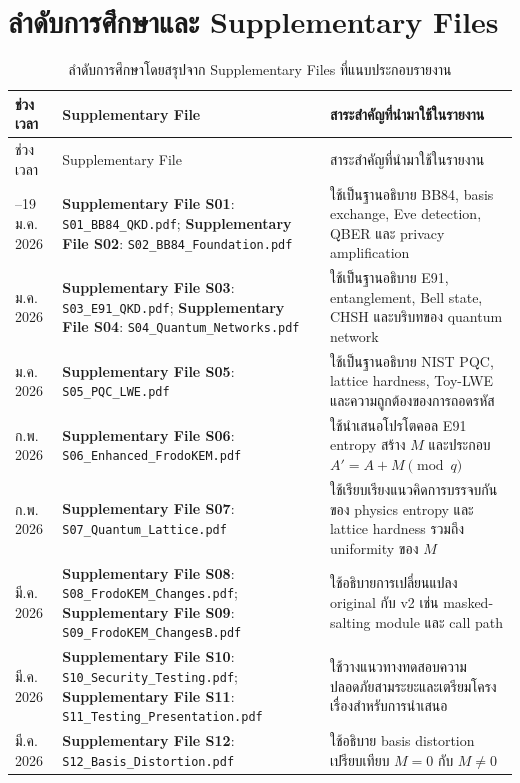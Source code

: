 \documentclass[14pt,a4paper]{extarticle}
\newcommand{\code}[1]{\texttt{#1}}
\newcommand{\suppfile}[1]{\textbf{Supplementary File #1}}
\begin{document}
\section{ลำดับการศึกษาและ Supplementary Files}
\begin{longtable}{>{\raggedright\arraybackslash}p{} >{\raggedright\arraybackslash}p{} >{\raggedright\arraybackslash}p{}}
    \caption{ลำดับการศึกษาโดยสรุปจาก Supplementary Files ที่แนบประกอบรายงาน}\\
    \toprule
    ช่วงเวลา & Supplementary File & สาระสำคัญที่นำมาใช้ในรายงาน \\
    \midrule
    \endfirsthead
    \toprule
    ช่วงเวลา & Supplementary File & สาระสำคัญที่นำมาใช้ในรายงาน \\
    \midrule
    \endhead
    15--19 ม.ค. 2026 & \suppfile{S01}: \code{S01\_BB84\_QKD.pdf}; \suppfile{S02}: \code{S02\_BB84\_Foundation.pdf} & ใช้เป็นฐานอธิบาย BB84, basis exchange, Eve detection, QBER และ privacy amplification \\
    23 ม.ค. 2026 & \suppfile{S03}: \code{S03\_E91\_QKD.pdf}; \suppfile{S04}: \code{S04\_Quantum\_Networks.pdf} & ใช้เป็นฐานอธิบาย E91, entanglement, Bell state, CHSH และบริบทของ quantum network \\
    30 ม.ค. 2026 & \suppfile{S05}: \code{S05\_PQC\_LWE.pdf} & ใช้เป็นฐานอธิบาย NIST PQC, lattice hardness, Toy-LWE และความถูกต้องของการถอดรหัส \\
    13 ก.พ. 2026 & \suppfile{S06}: \code{S06\_Enhanced\_FrodoKEM.pdf} & ใช้นำเสนอโปรโตคอล E91 entropy สร้าง $M$ และประกอบ $A'=A+M \pmod q$ \\
    18 ก.พ. 2026 & \suppfile{S07}: \code{S07\_Quantum\_Lattice.pdf} & ใช้เรียบเรียงแนวคิดการบรรจบกันของ physics entropy และ lattice hardness รวมถึง uniformity ของ $M$ \\
    20 มี.ค. 2026 & \suppfile{S08}: \code{S08\_FrodoKEM\_Changes.pdf}; \suppfile{S09}: \code{S09\_FrodoKEM\_ChangesB.pdf} & ใช้อธิบายการเปลี่ยนแปลง original กับ v2 เช่น masked-salting module และ call path \\
    27 มี.ค. 2026 & \suppfile{S10}: \code{S10\_Security\_Testing.pdf}; \suppfile{S11}: \code{S11\_Testing\_Presentation.pdf} & ใช้วางแนวทางทดสอบความปลอดภัยสามระยะและเตรียมโครงเรื่องสำหรับการนำเสนอ \\
    27 มี.ค. 2026 & \suppfile{S12}: \code{S12\_Basis\_Distortion.pdf} & ใช้อธิบาย basis distortion เปรียบเทียบ $M=0$ กับ $M\neq0$ \\
    \bottomrule
\end{longtable}
\end{document}

